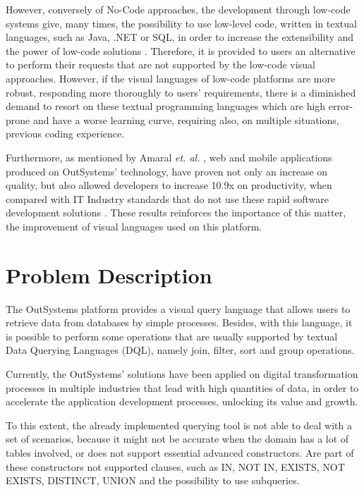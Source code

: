 However, conversely of No-Code approaches, the development through low-code systems give, many times, the possibility to use low-level code, written in textual languages, such as Java, .NET or SQL, in order to increase the extensibility and the power of low-code solutions \cite{outsystems_lowcodeVsNocode}. Therefore, it is provided to users an alternative to perform their requests that are not supported by the low-code visual approaches. However, if the visual languages of low-code platforms are more robust, responding more thoroughly to users’ requirements, there is a diminished demand to resort on these textual programming languages which are high error-prone and have a worse learning curve, requiring also, on multiple situations, previous coding experience.

Furthermore, as mentioned by  Amaral \textit{et. al.} \cite{improvingTheDeveloperExperienceWithALowCodeProcessModellingLanguage}, web and mobile applications produced on OutSystems’ technology, have proven not only an increase on quality, but also allowed developers to increase 10.9x on productivity, when compared with  IT Industry standards that do not use these rapid software development solutions \cite{outByNumbers2013}. These results reinforces the importance of this matter, the improvement of visual languages used on this platform.


\section{Problem Description}
\label{sec:problem_description}
The OutSystems platform provides a visual query language that allows users to retrieve data from databases by simple processes. Besides, with this language, it is possible to perform some operations that are usually supported by textual Data Querying Languages (DQL), namely join, filter, sort and group operations.

Currently, the OutSystems’ solutions have been applied on digital transformation processes in multiple industries that lead with high quantities of data, in order to accelerate the application development processes, unlocking its value and growth.

To this extent, the already implemented querying tool is not able to deal with a set of scenarios, because it might not be accurate when the domain has a lot of tables involved, or does not support essential advanced constructors. Are part of these constructors not supported clauses, such as IN, NOT IN, EXISTS, NOT EXISTS, DISTINCT, UNION and the possibility to use subqueries.


